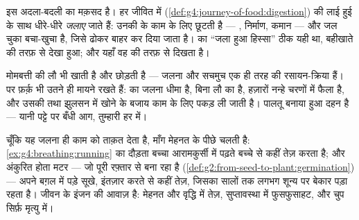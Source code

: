 \begin{proposition}[श्वसन कोशिकाओं को ताक़त देता है]\label{prop:g7:what-is-respiration:power}
इस अदला-बदली का मक़सद \emph{} है। हर जीवित  में 
(\cref{def:g4:journey-of-food:digestion})  की लाई हुई  के
साथ धीरे-धीरे \emph{जलाए} जाते हैं: उनकी   के काम के लिए
छूटती है --- , निर्माण, कमान --- और  जल चुका
बचा-खुचा है, जिसे ढोकर बाहर कर दिया जाता है।
 का ``जला हुआ हिस्सा'' ठीक यही
था, बहीखाते की तरफ़ से देखा हुआ; और यहाँ वह  की तरफ़ से दिखता है।
\end{proposition}
\admitted

\begin{example}[आग वाली तुलना, ईमानदारी से इस्तेमाल की हुई]\label{ex:g7:what-is-respiration:fire}
मोमबत्ती की लौ भी  खाती है और  छोड़ती है ---
जलना और  सचमुच एक ही तरह की रसायन-क्रिया हैं। पर फ़र्क़ भी उतने ही
मायने रखते हैं:  का जलना धीमा है, बिना लौ का है, हज़ारों नन्हे
चरणों में फैला है, और उसकी   तथा झुलसन में खोने के बजाय काम
के लिए पकड़ ली जाती है।  पालतू बनाया हुआ दहन है --- यानी पट्टे पर
बँधी आग, तुम्हारी हर  में।
\end{example}

\begin{example}[माँग पढ़ना]\label{ex:g7:what-is-respiration:demand}
चूँकि यह जलना ही काम को ताक़त देता है, माँग मेहनत के पीछे चलती है:
\cref{ex:g4:breathing:running} का दौड़ता बच्चा आरामकुर्सी में पढ़ते बच्चे
से कहीं तेज़  करता है; और अंकुरित होता मटर --- जो पूरी रफ़्तार से
 बना रहा है (\cref{def:g2:from-seed-to-plant:germination}) --- अपने
बग़ल में पड़े सूखे, इंतज़ार करते  से कहीं तेज़, जिसका  सालों तक
लगभग शून्य पर बेकार पड़ा रहता है।  जीवन के इंजन की आवाज़ है: मेहनत
और वृद्धि में तेज़, सुप्तावस्था में फुसफुसाहट, और चुप सिर्फ़ मृत्यु
में।
\end{example}

